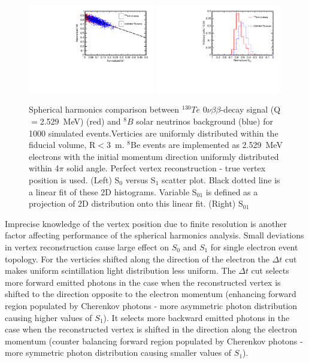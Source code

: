 \documentclass[12pt,twoside,letterpaper]{article}
\newcommand{\vbb}{0\nu\beta\beta}
\newcommand{\Te}{^{130}Te}
\newcommand{\B}{^{8}B}
\begin{document}
\begin{figure}[htb]
\centering
\includegraphics[angle=0,width=0.49\textwidth]{plots/hS0vsS1_Te130_1el_allLight_VtxSmear0cm_VtxShiftX0cm_momDT1p0ns_rndVtx_3p0mSphere.pdf}
\includegraphics[angle=0,width=0.49\textwidth]{plots/hS01_allLight_VtxSmear0cm_VtxShiftX0cm_momDT1p0ns_rndVtx_3p0mSphere.pdf}
\caption{Spherical harmonics comparison between $\Te$ $\vbb$-decay signal (Q$=$2.529~MeV) (red) and $\B$ solar neutrinos background (blue) for 1000 simulated events.Verticies are uniformly distributed within the fiducial volume, R$<$3~m. $^8$Be events are implemented as 2.529~MeV electrons with the initial momentum direction uniformly distributed within 4$\pi$ solid angle. Perfect vertex reconstruction - true vertex position is used. (Left) S$_0$ versus S$_1$ scatter plot. Black dotted line is a linear fit of these 2D histograms. Variable S$_{01}$ is defined as a projection of 2D distribution onto this linear fit. (Right) S$_{01}$}
\label{fig:SL_Te_SmearX0cm_momDT1ns_rndVtx_3p0m}
\end{figure}



Imprecise knowledge of the vertex position due to finite resolution is another factor affecting performance of the spherical harmonics analysis. Small deviations in vertex reconstruction cause large effect on $S_0$ and $S_1$ for single electron event topology. For the verticies shifted along the direction of the electron the $\Delta t$ cut makes uniform scintillation light distribution less uniform. The $\Delta t$ cut selects more forward emitted photons in the case when the reconstructed vertex is shifted to the direction opposite to the electron momentum (enhancing forward region populated by Cherenkov photons - more asymmetric photon distribution causing higher values of $S_1$). It selects more backward emitted photons in the case when the reconstructed vertex is shifted in the direction along the electron momentum (counter balancing forward region populated by Cherenkov photons - more symmetric photon distribution causing smaller values of $S_1$).
\end{document}
